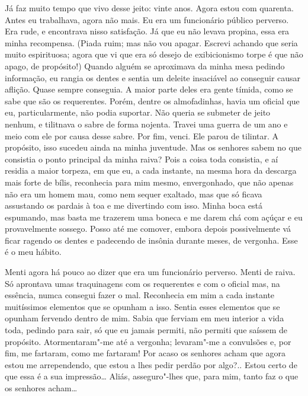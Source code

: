 Já faz muito tempo que vivo desse jeito: vinte anos. Agora estou com
quarenta. Antes eu trabalhava, agora não mais. Eu era um funcionário
público perverso. Era rude, e encontrava nisso satisfação. Já que eu não
levava propina, essa era minha recompensa. (Piada ruim; mas não vou
apagar. Escrevi achando que seria muito espirituosa; agora que vi que
era só desejo de exibicionismo torpe é que não apago, de propósito!)
Quando alguém se aproximava da minha mesa pedindo informação, eu rangia
os dentes e sentia um deleite insaciável ao conseguir causar aflição.
Quase sempre conseguia. A maior parte deles era gente tímida, como se
sabe que são os requerentes. Porém, dentre os almofadinhas, havia um
oficial que eu, particularmente, não podia suportar. Não queria se
submeter de jeito nenhum, e tilitnava o sabre de forma nojenta. Travei
uma guerra de um ano e meio com ele por causa desse sabre. Por fim,
venci. Ele parou de tilintar. A propósito, isso sucedeu ainda na minha
juventude. Mas os senhores sabem no que consistia o ponto principal da
minha raiva? Pois a coisa toda consistia, e aí residia a maior torpeza,
em que eu, a cada instante, na mesma hora da descarga mais forte de
bílis, reconhecia para mim mesmo, envergonhado, que não apenas não era
um homem mau, como nem sequer exaltado, mas que só ficava assustando os
pardais à toa e me divertindo com isso. Minha boca está espumando, mas
basta me trazerem uma boneca e me darem chá com açúçar e eu
provavelmente sossego. Posso até me comover, embora depois possivelmente
vá ficar ragendo os dentes e padecendo de insônia durante meses, de
vergonha. Esse é o meu hábito.

Menti agora há pouco ao dizer que era um funcionário perverso. Menti de
raiva. Só aprontava umas traquinagens com os requerentes e com o oficial
mas, na essência, numca consegui fazer o mal. Reconhecia em mim a cada
instante muitíssimos elementos que se opunham a isso. Sentia esses
elementos que se opunham fervendo dentro de mim. Sabia que ferviam em
meu interior a vida toda, pedindo para sair, só que eu jamais permiti,
não permiti que saíssem de propósito. Atormentaram"-me até a vergonha;
levaram"-me a convulsões e, por fim, me fartaram, como me fartaram! Por
acaso os senhores acham que agora estou me arrependendo, que estou a
lhes pedir perdão por algo?.. Estou certo de que essa é a sua
impressão\ldots{} Aliás, asseguro"-lhes que, para mim, tanto faz o que os
senhores acham\ldots{}

